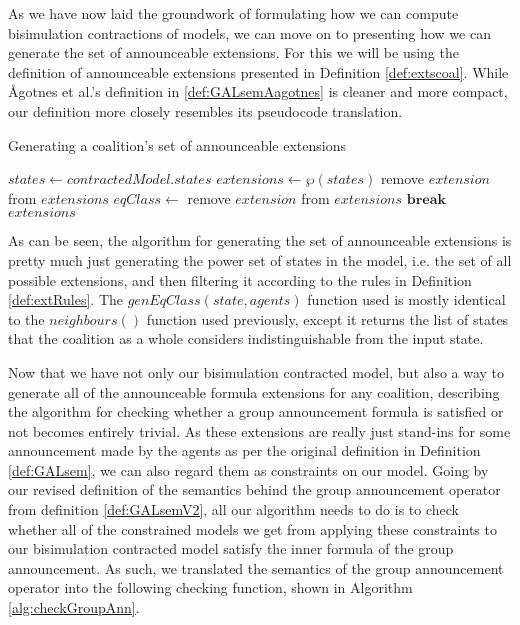 As we have now laid the groundwork of formulating  how we can compute bisimulation contractions of models, we can move on to presenting how we can generate the set of announceable extensions. For this we will be using the definition of announceable extensions presented in Definition \ref{def:extscoal}. While Ågotnes et al.'s definition in \ref{def:GALsemAagotnes} is cleaner and more compact, our definition more closely resembles its  pseudocode translation.

\begin{algorithm}
	\caption{Generating a coalition's set of announceable extensions}
	\label{alg:genAnnExts}
	\begin{algorithmic}
			\State $states \gets contractedModel.states$
			\State $extensions \gets \wp(states)$
					\State remove $extension$ from $extensions$
				\Else
						\State $eqClass \gets $
								\State remove $extension$ from $extensions$
								\State $\mathbf{break}$
							\EndIf
						\EndFor
					\EndFor
				\EndIf				
			\EndFor
			\State \Return $extensions$
		\EndFunction
	\end{algorithmic}
\end{algorithm}

As can be seen, the algorithm for generating the set of announceable extensions is pretty much just generating the power set of states in the model, i.e. the set of all possible extensions, and then filtering it according to the rules in Definition \ref{def:extRules}. The $genEqClass(state, agents)$ function used is mostly identical to the $neighbours()$ function used previously, except it returns the list of states that the coalition as a whole considers indistinguishable from the input state. 

Now that we have not only our bisimulation contracted model, but also a way to generate all of the announceable formula extensions for any coalition, describing the algorithm for checking whether a group announcement formula is satisfied or not becomes entirely trivial. As these extensions are really just stand-ins for some announcement made by the agents as per the original definition in Definition \ref{def:GALsem}, we can also regard them as constraints on our model. Going by our revised definition of the semantics behind the group announcement operator from definition \ref{def:GALsemV2}, all our algorithm needs to do is to check whether all of the constrained models we get from applying these constraints to our bisimulation contracted model satisfy the inner formula  of the group announcement. As such, we translated the semantics of the group announcement operator into the following checking function, shown in Algorithm \ref{alg:checkGroupAnn}.

